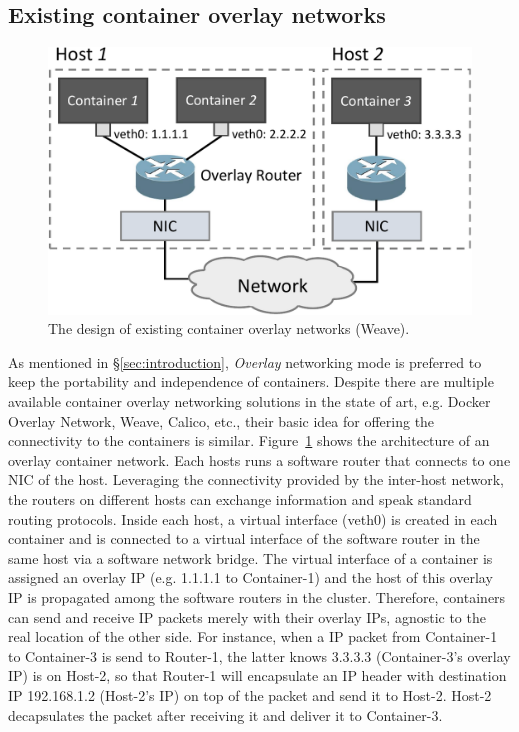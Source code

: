 \subsection{Existing container overlay networks}



\begin{figure}[h]  
	\centering   
	\includegraphics[width=0.8\linewidth]{figures/overlay-2.pdf}   
	\caption{\label{fig:overlay} The design of existing container overlay networks (Weave).}   
\end{figure}   

As mentioned in \S\ref{sec:introduction}, {\em Overlay} networking mode 
is preferred to keep the portability and independence of containers.
Despite there are multiple available container overlay networking solutions
in the state of art, e.g. Docker Overlay Network, Weave, Calico, etc., 
their basic idea for offering the connectivity to the containers is similar.
Figure~\ref{fig:overlay} shows the architecture of an overlay container network.
Each hosts runs a software router that connects to one NIC of the host. 
Leveraging the connectivity provided by the inter-host network, the routers
on different hosts can exchange information and speak standard routing protocols.
Inside each host, a virtual interface (veth0) is created in each container and is connected to a virtual interface of the software router in the same host via a software network bridge. The virtual interface of a container is assigned
an overlay IP (e.g. 1.1.1.1 to Container-1) and the host of this overlay IP
is propagated among the software routers in the cluster. Therefore, containers
can send and receive IP packets merely with their overlay IPs, agnostic to
the real location of the other side. For instance, when a IP packet from
Container-1 to Container-3 is send to Router-1, the latter knows 3.3.3.3
(Container-3's overlay IP) is on Host-2, so that Router-1 will encapsulate 
an IP header with destination IP 192.168.1.2 (Host-2's IP) on top of the packet
and send it to Host-2. Host-2 decapsulates the packet after receiving it
and deliver it to Container-3.  

